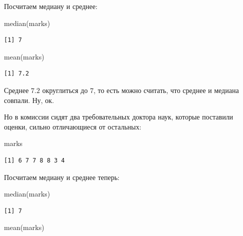 \documentclass[
  letterpaper,
]{scrbook}
\newenvironment{Shaded}{}{}
\newcommand{\FunctionTok}[1]{\textcolor[rgb]{0.44,0.26,0.76}{#1}}
\newcommand{\NormalTok}[1]{\textcolor[rgb]{0.14,0.16,0.18}{#1}}
\theoremstyle{definition}
\theoremstyle{remark}
\begin{document}
Посчитаем медиану и среднее:

\begin{Shaded}
\begin{Highlighting}[]
\FunctionTok{median}\NormalTok{(marks)}
\end{Highlighting}
\end{Shaded}

\begin{verbatim}
[1] 7
\end{verbatim}

\begin{Shaded}
\begin{Highlighting}[]
\FunctionTok{mean}\NormalTok{(marks)}
\end{Highlighting}
\end{Shaded}

\begin{verbatim}
[1] 7.2
\end{verbatim}

Среднее \(7.2\) округлиться до \(7\), то есть можно считать, что среднее
и медиана совпали. Ну, ок.

Но в комиссии сидят два требовательных доктора наук, которые поставили
оценки, сильно отличающиеся от остальных:

\begin{Shaded}
\begin{Highlighting}[]
\NormalTok{marks}
\end{Highlighting}
\end{Shaded}

\begin{verbatim}
[1] 6 7 7 8 8 3 4
\end{verbatim}

Посчитаем медиану и среднее теперь:

\begin{Shaded}
\begin{Highlighting}[]
\FunctionTok{median}\NormalTok{(marks)}
\end{Highlighting}
\end{Shaded}

\begin{verbatim}
[1] 7
\end{verbatim}

\begin{Shaded}
\begin{Highlighting}[]
\FunctionTok{mean}\NormalTok{(marks)}
\end{Highlighting}
\end{Shaded}
\end{document}
